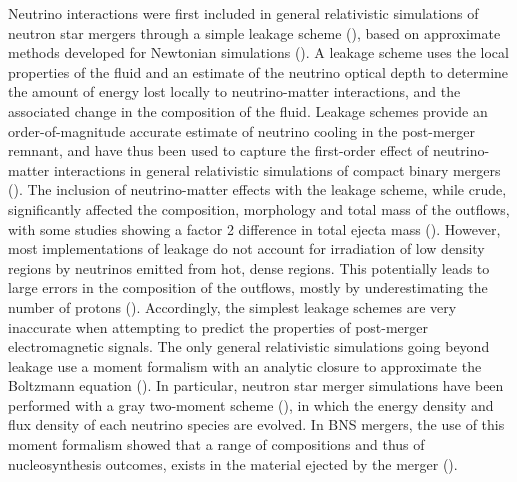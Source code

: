 Neutrino interactions were first included in general relativistic simulations of neutron star mergers through a simple leakage scheme (\citet*{sekiguchi:2011zd}), based on approximate methods developed for Newtonian simulations (\citet*{ruffert1996,rosswog:2003rv}). A leakage scheme uses the local properties of the fluid and an estimate of the neutrino optical depth to determine the amount of energy lost locally to neutrino-matter interactions, and the associated change in the composition of the fluid. Leakage schemes provide an order-of-magnitude accurate estimate of neutrino cooling in the post-merger remnant, and have thus been used to capture the first-order effect of neutrino-matter interactions in general relativistic simulations of compact binary mergers (\citet*{sekiguchi:2011zd,wanajo2014,lehner2016unequal,radice2016dynamical,palenzuela2015,deaton2013black,foucart2014neutron}). The inclusion of neutrino-matter effects with the leakage scheme, while crude, significantly affected the composition, morphology and total mass of the outflows, with some studies showing a factor 2 difference in total ejecta mass (\citet*{radice2016dynamical}). However, most implementations of leakage do not account for irradiation of low density regions by neutrinos emitted from hot, dense regions. This potentially leads to large errors in the composition of the outflows, mostly by underestimating the number of protons (\citet*{foucartm1:2016,foucart2015post}). Accordingly, the simplest leakage schemes are very inaccurate when attempting to predict the properties of post-merger electromagnetic signals. The only general relativistic simulations going beyond leakage use a moment formalism with an analytic closure to approximate the Boltzmann equation (\citet*{1981mnras.194..439t,shibata:11}). In particular, neutron star merger simulations have been performed with a gray two-moment scheme (\citet*{foucartm1:2016,foucart2015post,sekiguchi2015dynamical,sekiguchi2016dynamical}), in which the energy density and flux density of each neutrino species are evolved. In BNS mergers, the use of this moment formalism showed that a range of compositions and thus of nucleosynthesis outcomes, exists in the material ejected by the merger (\citet*{wanajo2014}). 

